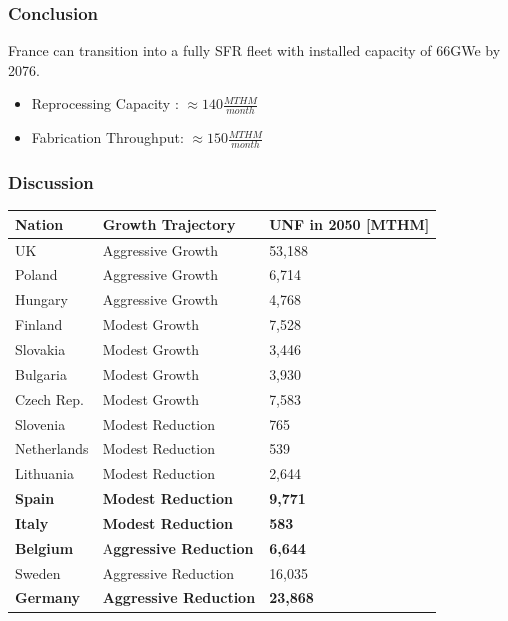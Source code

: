 \begin{frame}
	\frametitle{Conclusion}
	France can transition into
	a fully SFR fleet with installed capacity of 66GWe by 2076.
	\begin{itemize}
		\item Reprocessing Capacity : $\approx 140 \frac{MTHM}{month}$
		\item Fabrication Throughput: $\approx 150 \frac{MTHM}{month}$
	\end{itemize}
\end{frame}

\begin{frame}
    \frametitle{Discussion}
    \begin{table}[h]
\centering
    \begin{adjustbox}{max totalsize={1.1\textwidth}{.8\textheight}, center}
                \begin{tabularx}{\textwidth}{lbb}
                    \hline 
                    
                    \textbf{Nation} & \textbf{Growth Trajectory} & \small{\textbf{UNF in 2050 [MTHM] }}\\
                    \hline
                    UK & Aggressive Growth & 53,188\\
                    \hline
                    Poland & Aggressive Growth & 6,714\\
                    \hline
                    Hungary & Aggressive Growth & 4,768 \\ 
                    \hline
                    Finland & Modest Growth &  7,528\\
                    \hline
                    Slovakia & Modest Growth & 3,446\\
                    \hline
                    Bulgaria & Modest Growth & 3,930 \\
                    \hline
                    Czech Rep. & Modest Growth & 7,583\\
                    \hline
                    Slovenia & Modest Reduction & 765\\
                    \hline
                    Netherlands & Modest Reduction & 539\\
                    \hline
                    Lithuania & Modest Reduction & 2,644 \\
                    \hline 
                    \textbf{Spain} & \textbf{Modest Reduction} &  \textbf{9,771} \\
                    \hline
                    \textbf{Italy} & \textbf{Modest Reduction} & \textbf{583}\\
                    \hline
                    \textbf{Belgium} & A\textbf{ggressive Reduction} & \textbf{6,644}\\
                    \hline
                    Sweden & Aggressive Reduction & 16,035\\
                    \hline
                    \textbf{Germany} & \textbf{Aggressive Reduction} & \textbf{23,868}\\
                    \hline
                    

\end{tabularx}
\end{adjustbox}
\end{table}
\end{frame}

